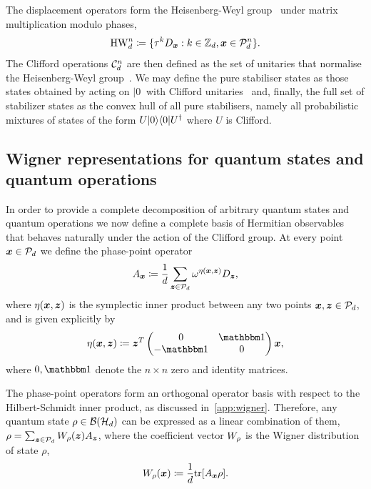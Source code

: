 \documentclass[pra,
aps,
twocolumn,
superscriptaddress,
groupedaddress,
nofootinbib,
reprint
]{revtex4-1}
\begin{document}
The displacement operators form the Heisenberg-Weyl group~\cite{Folland_1989, Bengtsson_2006} under matrix multiplication modulo phases,
\begin{equation}\label{eq:gp}
    {\rm{HW}}_d^n \coloneqq \{ \tau^k D_{\bmx}: k \in \mathbb{Z}_d, \bmx \in \cal{P}_d^n\}.
\end{equation}
The Clifford operations $ \cal{C}_d^n $ are then defined as the set of unitaries that normalise the Heisenberg-Weyl group~\cite{Appleby_2005}. We may define the pure stabiliser states as those states obtained by acting on $|0\>$ with Clifford unitaries~\cite{cit:gross3} and, finally, the full set of stabilizer states as the convex hull of all pure stabilisers, namely all probabilistic mixtures of states of the form $U|0\>\<0|U^\dagger$ where $U$ is Clifford. 

\subsection{Wigner representations for quantum states and quantum operations}\label{sec:wigner}

In order to provide a complete decomposition of arbitrary quantum states and quantum operations we now define a complete basis of Hermitian observables that behaves naturally under the action of the Clifford group. At every point $\x \in \P_d$ we define the phase-point operator
\begin{equation}\label{eq:ax}
	A_{\bmx} \coloneqq \frac{1}{d} \sum_{\bmz \in \cal{P}_d} \omega^{\eta(\bmx, \bmz)} D_{\bmz}, 
\end{equation}
where $\eta(\bmx, \bmz)$ is the symplectic inner product between any two points $\x,\z \in \P_d$, and is given explicitly by
\begin{equation}
	\eta(\bmx, \bmz) \coloneqq \bmz^T \begin{pmatrix}
		0  & \id \\ %
		-\id & 0 \\ %
	\end{pmatrix} \bmx,
\end{equation}
where $0, \id$ denote the $n\times n$ zero and identity matrices.

The phase-point operators form an orthogonal operator basis with respect to the Hilbert-Schmidt inner product, as discussed in~\cref{app:wigner}.
Therefore, any quantum state $\rho \in \cal{B}(\cal{H}_d)$ can be expressed as a linear combination of them, $\rho = \sum_{\bmz \in \cal{P}_d} \W[\bmz]{\rho} A_{\bmz}$, where the coefficient vector $\W{\rho}$ is the Wigner distribution of state $\rho$,
\begin{equation}\label{eq:wstate}
    \W[\bmx]{\rho} \coloneqq \frac{1}{d}\tr[A_{\bmx} \rho].
\end{equation}
\end{document}
